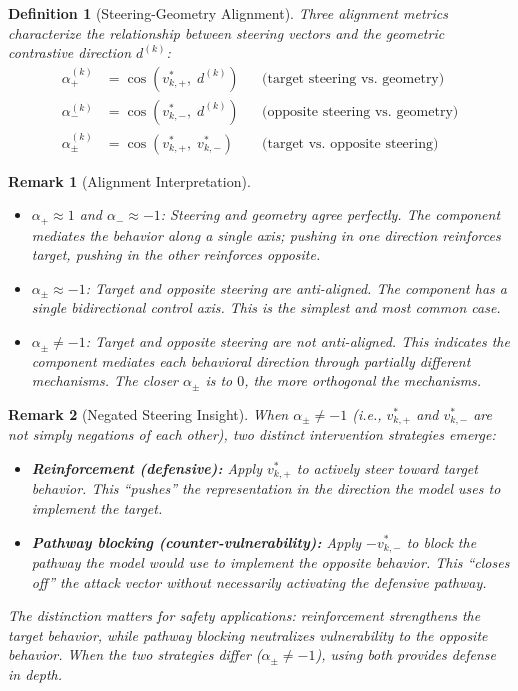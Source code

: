 \documentclass[11pt]{article}
\newtheorem{definition}{Definition}[section]
\newtheorem{remark}{Remark}[section]
\begin{document}
\begin{definition}[Steering-Geometry Alignment]
\label{def:steering-geometry-alignment}
Three alignment metrics characterize the relationship between steering vectors and the geometric contrastive direction $d^{(k)}$:
\begin{align}
\alpha^{(k)}_+ &= \cos(v^*_{k,+},\; d^{(k)}) & &\text{(target steering vs.\ geometry)} \\[0.5em]
\alpha^{(k)}_- &= \cos(v^*_{k,-},\; d^{(k)}) & &\text{(opposite steering vs.\ geometry)} \\[0.5em]
\alpha^{(k)}_\pm &= \cos(v^*_{k,+},\; v^*_{k,-}) & &\text{(target vs.\ opposite steering)}
\end{align}
\end{definition}

\begin{remark}[Alignment Interpretation]
\label{rem:steering-alignment-interpretation}
\begin{itemize}[nosep]
\item $\alpha_+ \approx 1$ and $\alpha_- \approx -1$: Steering and geometry agree perfectly. The component mediates the behavior along a single axis; pushing in one direction reinforces target, pushing in the other reinforces opposite.
\item $\alpha_\pm \approx -1$: Target and opposite steering are anti-aligned. The component has a single bidirectional control axis. This is the simplest and most common case.
\item $\alpha_\pm \neq -1$: Target and opposite steering are \emph{not} anti-aligned. This indicates the component mediates each behavioral direction through partially different mechanisms. The closer $\alpha_\pm$ is to $0$, the more orthogonal the mechanisms.
\end{itemize}
\end{remark}

\begin{remark}[Negated Steering Insight]
\label{rem:negated-steering}
When $\alpha_\pm \neq -1$ (i.e., $v^*_{k,+}$ and $v^*_{k,-}$ are not simply negations of each other), two distinct intervention strategies emerge:
\begin{itemize}[nosep]
\item \textbf{Reinforcement (defensive):} Apply $v^*_{k,+}$ to actively steer toward target behavior. This ``pushes'' the representation in the direction the model uses to implement the target.
\item \textbf{Pathway blocking (counter-vulnerability):} Apply $-v^*_{k,-}$ to block the pathway the model would use to implement the opposite behavior. This ``closes off'' the attack vector without necessarily activating the defensive pathway.
\end{itemize}
The distinction matters for safety applications: reinforcement strengthens the target behavior, while pathway blocking neutralizes vulnerability to the opposite behavior. When the two strategies differ ($\alpha_\pm \neq -1$), using both provides defense in depth.
\end{remark}
\end{document}
